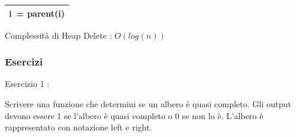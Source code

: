\documentclass{article}
\begin{document}
{\begin{longtable}[]{@{}l@{}}
\begin{minipage}[t]{0.97\columnwidth}
{\hspace*{0.333em}\hspace*{0.333em}\hspace*{0.333em}\hspace*{0.333em}\hspace*{0.333em}\hspace*{0.333em}\hspace*{0.333em}\hspace*{0.333em}\hspace*{0.333em}\hspace*{0.333em}\hspace*{0.333em}\hspace*{0.333em}\hspace*{0.333em}\hspace*{0.333em}\hspace*{0.333em}\hspace*{0.333em}\hspace*{0.333em}\hspace*{0.333em}\hspace*{0.333em}\hspace*{0.333em}\hspace*{0.333em}\hspace*{0.333em}\hspace*{0.333em}\hspace*{0.333em}\hspace*{0.333em}\hspace*{0.333em}\hspace*{0.333em}\hspace*{0.333em}\hspace*{0.333em}\hspace*{0.333em}\hspace*{0.333em}\hspace*{0.333em}}{i}{~=
parent(}{i}{)}\strut
\end{minipage}\tabularnewline
\bottomrule
\end{longtable}

{Complessità di Heap Delete : }$O(log(n))$

\hypertarget{h.r8bopy9q4g8f}{\subsubsection{\texorpdfstring{{Esercizi}}{Esercizi}}\label{h.r8bopy9q4g8f}}

{Esercizio 1 }{: }

{Scrivere una funzione che determini se un albero è quasi completo. Gli output devono essere 1 se l'albero è quasi completo o 0 se non lo è. }{L'albero è rappresentato con notazione left e right}{.}

}
\end{document}
